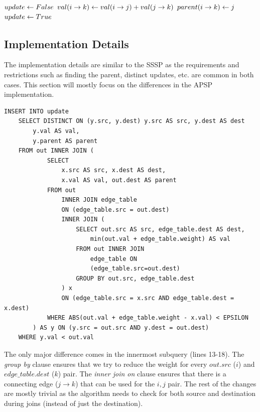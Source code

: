 \begin{algorithm}[APSP$(V,E)$] \label{alg:apsp}
\begin{algorithmic}[1]

		\State $update \leftarrow False$
		 			\State $val(i \rightarrow k) \leftarrow  val(i \rightarrow j) + val(j \rightarrow k)$
		 			\State $parent(i \rightarrow k) \leftarrow j$
		 			\State $update \leftarrow True$
		 		\EndIf
			\EndFor
		\EndFor
	\EndWhile
\end{algorithmic}
\end{algorithm}

\subsection{Implementation Details}

The implementation details are similar to the SSSP as the requirements and
restrictions such as finding the parent, distinct updates, etc. are common in
both cases. This section will mostly focus on the differences in the APSP
implementation.

\begin{algorithm}
\label{alg:apsp:findu}
\begin{lstlisting}
INSERT INTO update
	SELECT DISTINCT ON (y.src, y.dest) y.src AS src, y.dest AS dest
		y.val AS val,
		y.parent AS parent
	FROM out INNER JOIN (
			SELECT
				x.src AS src, x.dest AS dest,
				x.val AS val, out.dest AS parent
			FROM out
				INNER JOIN edge_table
				ON (edge_table.src = out.dest)
				INNER JOIN (
					SELECT out.src AS src, edge_table.dest AS dest,
						min(out.val + edge_table.weight) AS val
					FROM out INNER JOIN
						edge_table ON
						(edge_table.src=out.dest)
					GROUP BY out.src, edge_table.dest
				) x
				ON (edge_table.src = x.src AND edge_table.dest = x.dest)
			WHERE ABS(out.val + edge_table.weight - x.val) < EPSILON
		) AS y ON (y.src = out.src AND y.dest = out.dest)
	WHERE y.val < out.val
\end{lstlisting}
\end{algorithm}

The only major difference comes in the innermost subquery (lines 13-18). The
\emph{group by} clause ensures that we try to reduce the weight for every
$out.src$ ($i$) and $edge\_table.dest$ ($k$) pair. The \emph{inner join on}
clause ensures that there is a connecting edge ($j\rightarrow k$) that can be
used for the $i,j$ pair. The rest of the changes are mostly trivial as the
algorithm needs to check for both source and destination during joins (instead
of just the destination).


